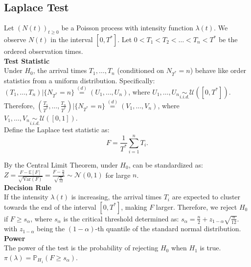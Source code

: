 \documentclass{journalstyle}
\begin{document}
\subsection{Laplace Test}

Let $(N(t))_{t \geq 0}$ be a Poisson process with intensity function $\lambda(t)$.
We observe $N(t)$ in the interval $[0, T^*]$.
Let $0 < T_1 < T_2 < \ldots < T_n < T^*$ be the ordered observation times. \\

\noindent\textbf{Test Statistic} \\
Under $H_0$, the arrival times $T_1, \ldots, T_n$ (conditioned on $N_{T^*} = n$) behave like order statistics from a uniform distribution.
Specifically: \\
$(T_1, \ldots, T_n) | \{N_{T^*} = n\} \overset{(d)}{=} (U_1, \ldots, U_n)$, where $U_1, \ldots, U_n \underset{i.i.d.}{\sim} \mathcal{U}([0, T^*])$. \\
Therefore, $(\frac{T_1}{T^*}, \ldots, \frac{T_n}{T^*}) | \{N_{T^*} = n\} \overset{(d)}{=} (V_1, \ldots, V_n)$, where $V_1, \ldots, V_n \underset{i.i.d.}{\sim} \mathcal{U}([0, 1])$. \\
Define the Laplace test statistic as: 
\begin{equation}
    F = \frac{1}{T^*} \sum_{i=1}^n T_i.
    \label{eq:laplace_test_statistic}
\end{equation}

By the Central Limit Theorem, under $H_0$,  can be standardized as: 
$Z = \frac{F - \mathbb{E}[F]}{\sqrt{\text{Var}(F)}} = \frac{F - \frac{n}{2}}{\sqrt{\frac{n}{12}}} \sim \mathcal{N}(0, 1)$
for large $n$. \\

\noindent\textbf{Decision Rule} \\
If the intensity $\lambda(t)$ is increasing, the arrival times $T_i$ are expected to cluster towards the end of the interval $[0, T^*]$, making $F$ larger.
Therefore, we reject $H_0$ if $F \geq s_{\alpha}$, where $s_{\alpha}$ is the critical threshold determined as: $s_{\alpha} = \frac{n}{2} + z_{1 - \alpha} \sqrt{\frac{n}{12}}$. \\
with $z_{1 - \alpha}$ being the $(1 - \alpha)$-th quantile of the standard normal distribution. \\

\noindent\textbf{Power} \\
The power of the test is the probability of rejecting $H_0$ when $H_1$ is true. \\
$\pi(\lambda) = \mathbb{P}_{H_1}(F \geq s_{\alpha})$.
\end{document}

